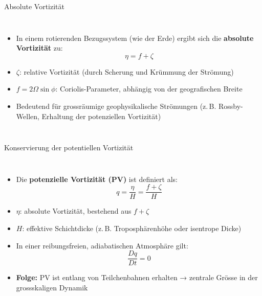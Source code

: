 \begin{frame}{Absolute Vortizität}
	\begin{columns}
		\begin{itemize}
			\item In einem rotierenden Bezugssystem (wie der Erde) ergibt sich die \textbf{absolute Vortizität} zu:
			      \[
				      \eta = f + \zeta
			      \]
			\item \( \zeta \): relative Vortizität (durch Scherung und Krümmung der Strömung)
			\item \( f = 2\Omega \sin\phi \): Coriolis-Parameter, abhängig von der geografischen Breite
			\item Bedeutend für grossräumige geophysikalische Strömungen (z.\,B. Rossby-Wellen, Erhaltung der potenziellen Vortizität)
		\end{itemize}

		\vspace{2cm}
	\end{columns}
\end{frame}


\begin{frame}{Konservierung der potentiellen Vortizität}
	\begin{columns}
		\column{0.99\textwidth}
		\begin{itemize}
			\item Die \textbf{potenzielle Vortizität (PV)} ist definiert als:
			      \[
				      q = \frac{\eta}{H} = \frac{f + \zeta}{H}
			      \]
			\item \( \eta \): absolute Vortizität, bestehend aus \( f + \zeta \)
			\item \( H \): effektive Schichtdicke (z.\,B. Troposphärenhöhe oder isentrope Dicke)
			\item In einer reibungsfreien, adiabatischen Atmosphäre gilt:
			      \[
				      \frac{Dq}{Dt} = 0
			      \]
			\item \textbf{Folge:} PV ist entlang von Teilchenbahnen erhalten → zentrale Grösse in der grossskaligen Dynamik
		\end{itemize}

		\column{0.4\textwidth}
		\vspace{2cm}
	\end{columns}
\end{frame}


